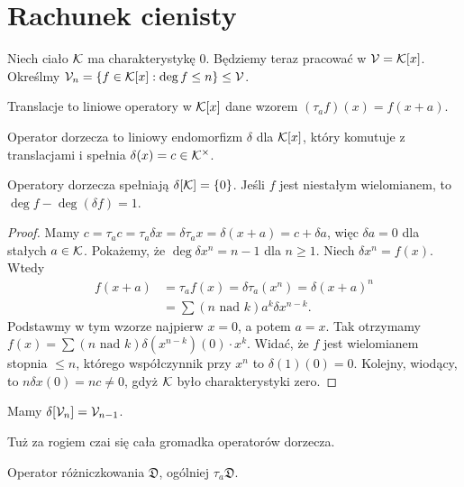 \section{Rachunek cienisty}
Niech ciało $\mathcal K$ ma charakterystykę $0$.
Będziemy teraz pracować w $\mathcal V = \mathcal K[x]$.
Określmy $\mathcal V_n = \{f \in \mathcal K[x] : \deg f \le n\} \le \mathcal V$.

\begin{definicja}
	Translacje to liniowe operatory w $\mathcal K[x]$ dane wzorem $(\tau_a f)(x) = f(x +a)$.
\end{definicja}

\begin{definicja} %
	Operator dorzecza to liniowy endomorfizm $\delta$ dla $\mathcal K[x]$, który komutuje z translacjami i spełnia $\delta(x) = c \in \mathcal K^\times$.
\end{definicja}

\begin{fakt}
	Operatory dorzecza spełniają $\delta[\mathcal K] = \{0\}$.
	Jeśli $f$ jest niestałym wielomianem, to $\deg f - \deg (\delta f) = 1$.
\end{fakt}

\begin{proof}
	Mamy $c = \tau_a c = \tau_a \delta x = \delta \tau_a x= \delta(x+a) = c + \delta a$, więc $\delta a = 0$ dla stałych $a \in \mathcal K$.
	Pokażemy, że $\deg \delta x^n = n - 1$ dla $n \ge 1$.
	Niech $\delta x^n = f(x)$. Wtedy
	\begin{align*}
		f(x + a) & = \tau_a f(x) = \delta \tau_a (x^n) = \delta (x+a)^n \\
		 & = \sum (n \mbox{ nad } k) a^k \delta x^{n-k}.
	\end{align*}
	Podstawmy w tym wzorze najpierw $x = 0$, a potem $a = x$.
	Tak otrzymamy $f(x) = \sum (n \mbox { nad } k) \delta(x^{n-k})(0) \cdot x^k$.
	Widać, że $f$ jest wielomianem stopnia $\le n$, którego współczynnik przy $x^n$ to $\delta(1)(0) = 0$.
	Kolejny, wiodący, to $n \delta x(0) = nc \neq 0$, gdyż $\mathcal K$ było charakterystyki zero.
\end{proof}

\begin{wniosek}
	Mamy $\delta[\mathcal V_n] = \mathcal V_{n-1}$.
\end{wniosek}

Tuż za rogiem czai się cała gromadka operatorów dorzecza.

\begin{przyklad}
	Operator różniczkowania $\mathfrak D$, ogólniej $\tau_a \mathfrak D$.
\end{przyklad}

